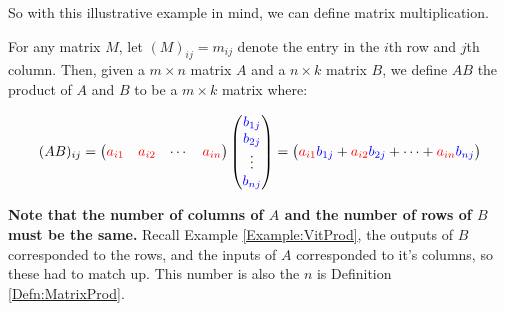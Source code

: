 So with this illustrative example in mind, we can define matrix multiplication.

\begin{definition}\label{Defn:MatrixProd}
For any matrix $M$, let $(M)_{ij}=m_{ij}$ denote the entry in the $i$th row and $j$th column.   Then, given a $m\times n$ matrix $A$ and a $n\times k$ matrix $B$, we define $AB$ the product of $A$ and $B$ to be a $m\times k$ matrix where:

$$(AB)_{ij}=\begin{pmatrix}\textcolor{red}{a_{i1}} & \textcolor{red}{a_{i2}} & \cdots & \textcolor{red}{a_{in}}\end{pmatrix}\begin{pmatrix}\textcolor{blue}{b_{1j}} \\ \textcolor{blue}{b_{2j}} \\ \vdots \\ \textcolor{blue}{b_{nj}}\end{pmatrix}=\begin{pmatrix}\textcolor{red}{a_{i1}}\textcolor{blue}{b_{1j}}+\textcolor{red}{a_{i2}}\textcolor{blue}{b_{2j}}+\cdots+\textcolor{red}{a_{in}}\textcolor{blue}{b_{nj}} \end{pmatrix}$$

\end{definition}

\textbf{Note that the number of columns of $A$ and the number of rows of $B$ must be the same.}  Recall Example \ref{Example:VitProd}, the outputs of $B$ corresponded to the rows, and the inputs of $A$ corresponded to it's columns, so these had to match up.  This number is also the $n$ is Definition \ref{Defn:MatrixProd}.


